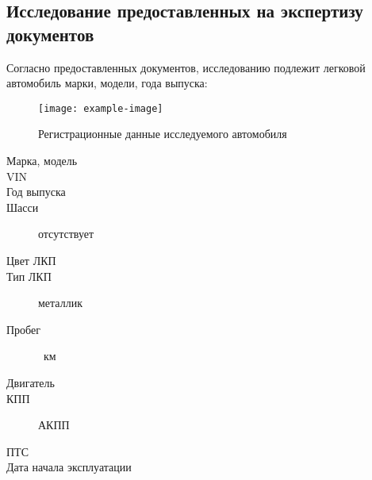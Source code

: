 \subsection{Исследование предоставленных на экспертизу документов}
%
Согласно предоставленных документов,  исследованию подлежит легковой автомобиль  марки, модели, года выпуска:
\begin{figure}[H]
	\centering
	\texttt{[image: example-image]}
	\caption{Регистрационные данные исследуемого автомобиля}
\end{figure}

\parbox[]{15cm}{
	\begin{description}
		\item[Марка, модель] \hfill {}
		\item[VIN] \hfill \vin
		\item[Год выпуска] \hfill {}
		\item[Шасси] \hfill отсутствует
		\item[Цвет ЛКП] \hfill {}
		\item[Тип ЛКП] \hfill металлик
		\item[Пробег] \hfill  {}\, км%
		\item[Двигатель] \hfill {}
		\item[КПП] \hfill АКПП
		\item[ПТС] \hfill{}	
		\item[Дата начала эксплуатации] \hfill{}
	\end{description}
	
	
	
	

}
